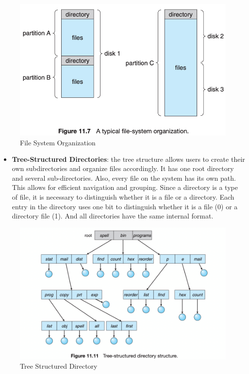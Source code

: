 \documentclass{homework}
\begin{document}
\begin{figure}[h]
\begin{center}
\includegraphics[scale=0.7]{35.png}    
\caption{File System Organization}
\end{center}
\end{figure}

\begin{itemize}
    \item \textbf{Tree-Structured Directories}: the tree structure allows users to create their own subdirectories and organize files accordingly. It has one root directory and several sub-directories. Also, every file on the system has its own path. This allows for efficient navigation and grouping. Since a directory is a type of file, it is necessary to distinguish whether it is a file or a directory. Each entry in the directory uses one bit to distinguish whether it is a file (0) or a directory file (1). And all directories have the same internal format.
\end{itemize}

\begin{figure}[h]
\begin{center}
\includegraphics[scale=0.7]{36.png}    
\caption{Tree Structured Directory}
\end{center}
\end{figure}
\end{document}

